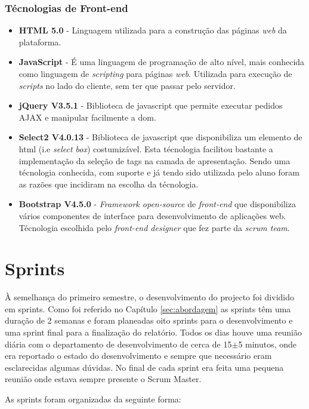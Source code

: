\subsubsection{Técnologias de Front-end}
\begin{itemize}
	\item \textbf{HTML 5.0} - Linguagem utilizada para a construção das páginas \textit{web} da plataforma.
	\item \textbf{JavaScript} - É uma linguagem de programação de alto nível, mais conhecida como linguagem de \textit{scripting} para páginas \textit{web}. Utilizada para execução de \textit{scripts} no lado do cliente, sem ter que passar pelo servidor.
	\item \textbf{jQuery V3.5.1} - Biblioteca de javascript que permite executar pedidos AJAX e manipular facilmente a \acrfull{dom}. 
	\item \textbf{Select2 V4.0.13} - Biblioteca de javascript que disponibiliza um elemento de html (i.e \textit{select box}) costumizável. Esta técnologia facilitou bastante a implementação da seleção de tags na camada de apresentação. Sendo uma técnologia conhecida, com suporte e já tendo sido utilizada pelo aluno foram as razões que incidiram na escolha da técnologia.
	\item \textbf{Bootstrap V4.5.0} - \textit{Framework open-source} de \textit{front-end} que disponibiliza vários componentes de interface para desenvolvimento de aplicações web. Técnologia escolhida pelo \textit{front-end designer} que fez parte da \textit{scrum team}.
\end{itemize}


\section{Sprints}
\label{sec:sprints}

À semelhança do primeiro semestre, o desenvolvimento do projecto foi dividido em sprints. Como foi referido no Capítulo \ref{sec:abordagem} as sprints têm uma duração de 2 semanas e foram planeadas oito sprints para o desenvolvimento e uma sprint final para a finalização do relatório. Todos os dias houve uma reunião diária com o departamento de desenvolvimento de cerca de 15$\pm$5 minutos, onde era reportado o estado do desenvolvimento e sempre que necessário eram esclarecidas algumas dúvidas. No final de cada sprint era feita uma pequena reunião onde estava sempre presente o Scrum Master.

As sprints foram organizadas da seguinte forma:



